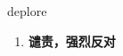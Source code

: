 
\begin{frame}
{\huge deplore}
\begin{center}
\begin{enumerate}\Large
  \item \textbf{谴责，强烈反对}
\end{enumerate}
\end{center}
\end{frame}
